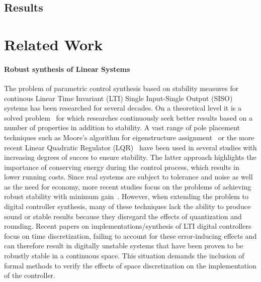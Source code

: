 \documentclass{sig-alternate-05-2015}
\begin{document}
\subsection{Results}
\label{experimental-results}

\section{Related Work}

\paragraph{Robust synthesis of Linear Systems} 

The problem of parametric control synthesis based on stability measures for
continous Linear Time Invariant (LTI) Single Input-Single Output (SISO)
systems has been researched for several decades.  On a theoretical level it
is a solved problem~\cite{wonham1967pole} for which researches continuously
seek better results based on a number of properties in addition to
stability.  A vast range of pole placement techniques such as Moore's
algorithm for eigenstructure assignment~\cite{klein1977eigenvalue} or the
more recent Linear Quadratic Regulator (LQR)~\cite{bemporad2002explicit}
have been used in several studies with increasing degrees of succes to
ensure stability.  The latter approach highlights the importance of
conserving energy during the control process, which results in lower running
costs.  Since real systems are subject to tolerance and noise as well as the
need for economy, more recent studies focus on the problems of achieving
robust stability with minimum
gain~\cite{schmid2014unified,konigorski2012pole}.  However, when extending
the problem to digital controller synthesis, many of these techniques lack
the ability to produce sound or stable results because they disregard the
effects of quantization and rounding.  Recent papers on
implementations/synthesis of LTI digital
controllers~\cite{das2013lqr,ghosh2013fpga} focus on time discretization,
failing to account for these error-inducing effects and can therefore result
in digitally unstable systems that have been proven to be robustly stable in
a continuous space.  This situation demands the inclusion of formal methods
to verify the effects of space discretization on the implementation of the
controller.
\end{document}

